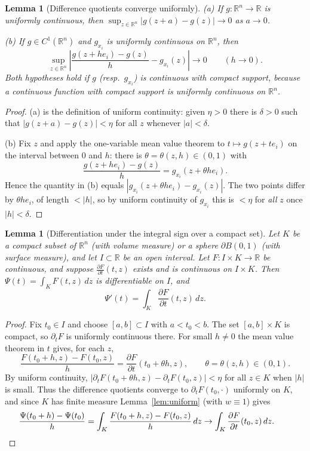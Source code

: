 \documentclass[11pt]{article}
\theoremstyle{plain}
\newtheorem{lemma}[theorem]{Lemma}
\theoremstyle{definition}
\theoremstyle{remark}
\begin{document}
\begin{lemma}[Difference quotients converge uniformly]\label{lem:dq}
(a) If $g : \mathbb{R}^n \to \mathbb{R}$ is uniformly continuous, then $\sup_{z \in \mathbb{R}^n} |g(z + a) - g(z)| \to 0$ as $a \to 0$.

(b) If $g \in C^1(\mathbb{R}^n)$ and $g_{x_i}$ is uniformly continuous on $\mathbb{R}^n$, then
$$ \sup_{z \in \mathbb{R}^n} \left| \frac{g(z + he_i) - g(z)}{h} - g_{x_i}(z) \right| \to 0 \qquad (h \to 0). $$
Both hypotheses hold if $g$ (resp.\ $g_{x_i}$) is continuous with compact support, because a continuous function with compact support is uniformly continuous on $\mathbb{R}^n$.
\end{lemma}
\begin{proof}
(a) is the definition of uniform continuity: given $\eta > 0$ there is $\delta > 0$ such that $|g(z+a) - g(z)| < \eta$ for all $z$ whenever $|a| < \delta$.

(b) Fix $z$ and apply the one-variable mean value theorem to $t \mapsto g(z + te_i)$ on the interval between $0$ and $h$: there is $\theta = \theta(z,h) \in (0,1)$ with
$$ \frac{g(z+he_i) - g(z)}{h} = g_{x_i}(z + \theta h e_i). $$
Hence the quantity in (b) equals $|g_{x_i}(z + \theta h e_i) - g_{x_i}(z)|$. The two points differ by $\theta h e_i$, of length $< |h|$, so by uniform continuity of $g_{x_i}$ this is $< \eta$ for \emph{all} $z$ once $|h| < \delta$.
\end{proof}

\begin{lemma}[Differentiation under the integral sign over a compact set]\label{lem:diffint}
Let $K$ be a compact subset of $\mathbb{R}^n$ (with volume measure) or a sphere $\partial B(0,1)$ (with surface measure), and let $I \subset \mathbb{R}$ be an open interval. Let $F : I \times K \to \mathbb{R}$ be continuous, and suppose $\frac{\partial F}{\partial t}(t,z)$ exists and is continuous on $I \times K$. Then $\Psi(t) = \int_K F(t,z)\, dz$ is differentiable on $I$, and
$$ \Psi'(t) = \int_K \frac{\partial F}{\partial t}(t,z)\, dz. $$
\end{lemma}
\begin{proof}
Fix $t_0 \in I$ and choose $[a,b] \subset I$ with $a < t_0 < b$. The set $[a,b] \times K$ is compact, so $\partial_t F$ is uniformly continuous there. For small $h \neq 0$ the mean value theorem in $t$ gives, for each $z$,
$$ \frac{F(t_0 + h, z) - F(t_0, z)}{h} = \frac{\partial F}{\partial t}(t_0 + \theta h, z), \qquad \theta = \theta(z,h) \in (0,1). $$
By uniform continuity, $\big|\partial_t F(t_0 + \theta h, z) - \partial_t F(t_0, z)\big| < \eta$ for all $z \in K$ when $|h|$ is small. Thus the difference quotients converge to $\partial_t F(t_0,\cdot)$ uniformly on $K$, and since $K$ has finite measure Lemma~\ref{lem:uniform} (with $w \equiv 1$) gives
$$ \frac{\Psi(t_0+h) - \Psi(t_0)}{h} = \int_K \frac{F(t_0+h,z) - F(t_0,z)}{h}\, dz \to \int_K \frac{\partial F}{\partial t}(t_0, z)\, dz. \qquad \qedhere $$
\end{proof}
\end{document}
